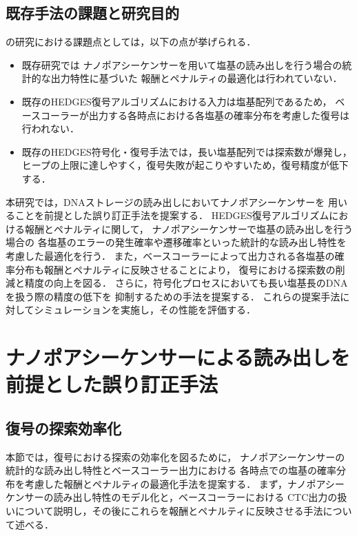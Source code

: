 \documentclass[sotsuron]{kuee}
\begin{document}
\section{既存手法の課題と研究目的} \label{sec:problem}
\cite{HEDGES}の研究における課題点としては，以下の点が挙げられる．
\begin{itemize}
  \item 既存研究では
  ナノポアシーケンサーを用いて塩基の読み出しを行う場合の統計的な出力特性に基づいた
  報酬とペナルティの最適化は行われていない．
  \item 既存のHEDGES復号アルゴリズムにおける入力は塩基配列であるため，
  ベースコーラーが出力する各時点における各塩基の確率分布を考慮した復号は行われない．
  \item 既存のHEDGES符号化・復号手法では，長い塩基配列では探索数が爆発し，
  ヒープの上限に達しやすく，復号失敗が起こりやすいため，復号精度が低下する．
\end{itemize}
本研究では，DNAストレージの読み出しにおいてナノポアシーケンサーを
用いることを前提とした誤り訂正手法を提案する．
HEDGES復号アルゴリズムにおける報酬とペナルティに関して，
ナノポアシーケンサーで塩基の読み出しを行う場合の
各塩基のエラーの発生確率や遷移確率といった統計的な読み出し特性を考慮した最適化を行う．
また，ベースコーラーによって出力される各塩基の確率分布も報酬とペナルティに反映させることにより，
復号における探索数の削減と精度の向上を図る．
さらに，符号化プロセスにおいても長い塩基長のDNAを扱う際の精度の低下を
抑制するための手法を提案する．
これらの提案手法に対してシミュレーションを実施し，その性能を評価する．

\chapter{ナノポアシーケンサーによる読み出しを前提とした誤り訂正手法}\label{proposed_method}
\section{復号の探索効率化} \label{optimization}
本節では，復号における探索の効率化を図るために，
ナノポアシーケンサーの統計的な読み出し特性とベースコーラー出力における
各時点での塩基の確率分布を考慮した報酬とペナルティの最適化手法を提案する．
まず，ナノポアシーケンサーの読み出し特性のモデル化と，ベースコーラーにおける
CTC出力の扱いについて説明し，その後にこれらを報酬とペナルティに反映させる手法について述べる．
\end{document}
